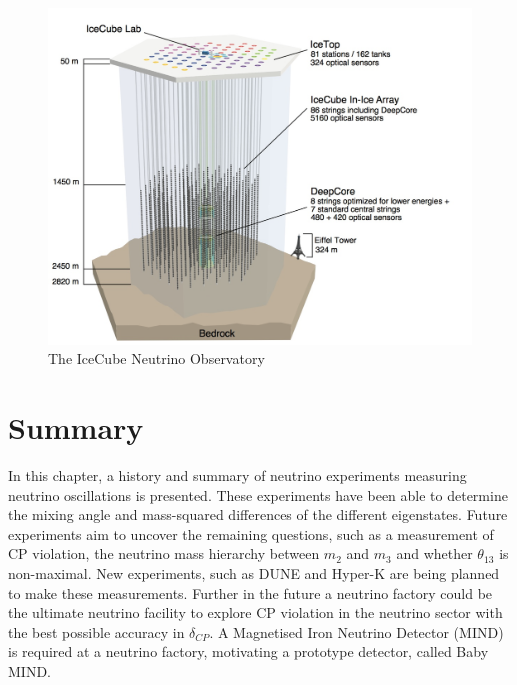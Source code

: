 \begin{figure}
\centering
\includegraphics[width=.5\textwidth]{figures/IceCube.jpeg}
\caption{The IceCube Neutrino Observatory}
\end{figure}
\fi

\section{Summary}

In this chapter, a history and summary of neutrino experiments measuring neutrino oscillations is presented. These experiments have been able to determine the mixing angle and mass-squared differences of the different eigenstates. Future experiments aim to uncover the remaining questions, such as a measurement of CP violation, the neutrino mass hierarchy between $m_2$ and $m_3$ and whether $\theta_{13}$ is non-maximal. New experiments, such as DUNE and Hyper-K are being planned to make these measurements. Further in the future a neutrino factory could be the ultimate neutrino facility to explore CP violation in the neutrino sector with the best possible accuracy in $\delta_{CP}$. A Magnetised Iron Neutrino Detector (MIND) is required at a neutrino factory, motivating a prototype detector, called Baby MIND. 






